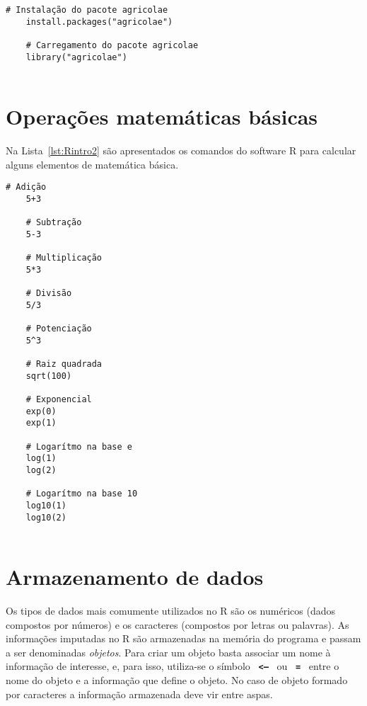 \documentclass[11pt,fleqn]{book} %
\begin{document}
\begin{scriptsize}
	\estiloR
	\begin{lstlisting}[caption={Comandos do software R}, label=lst:Rintro1]
	# Instalação do pacote agricolae
	install.packages("agricolae")
	
	# Carregamento do pacote agricolae
	library("agricolae")
	
	\end{lstlisting}
\end{scriptsize}



\section{Operações matemáticas básicas}

Na Lista~\ref{lst:Rintro2} são apresentados os comandos do software R para calcular alguns elementos de matemática básica. \\

\begin{scriptsize}
	\estiloR
	\begin{lstlisting}[caption={Comandos do software R}, label=lst:Rintro2]
	# Adição
	5+3
	
	# Subtração
	5-3
	
	# Multiplicação
	5*3	
	
	# Divisão
	5/3
	
	# Potenciação
	5^3	
	
	# Raiz quadrada
	sqrt(100)
	
	# Exponencial
	exp(0)
	exp(1)	
	
	# Logarítmo na base e
	log(1)
	log(2)
	
	# Logarítmo na base 10
	log10(1)
	log10(2)
	
	\end{lstlisting}
\end{scriptsize}



\section{Armazenamento de dados}

Os tipos de dados mais comumente utilizados no R são os numéricos (dados compostos por números) e os caracteres (compostos por letras ou palavras). As informações imputadas no R são armazenadas na memória do programa e passam a ser denominadas {\itshape objetos}. Para criar um objeto basta associar um nome à informação de interesse, e, para isso, utiliza-se o símbolo \, {\bf \texttt{<--}} \, ou \, {\bf \texttt{=}} \, entre o nome do objeto e a informação que define o objeto. No caso de objeto formado por caracteres a informação armazenada deve vir entre aspas.
\end{document}
